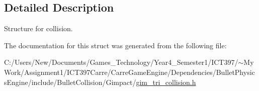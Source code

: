 \subsection{Detailed Description}
Structure for collision. 

The documentation for this struct was generated from the following file:\begin{CompactItemize}
\item 
C:/Users/New/Documents/Games\_\-Technology/Year4\_\-Semester1/ICT397/$\sim$My Work/Assignment1/ICT397Carre/CarreGameEngine/Dependencies/BulletPhysicsEngine/include/BulletCollision/Gimpact/\hyperlink{gim__tri__collision_8h}{gim\_\-tri\_\-collision.h}\end{CompactItemize}
